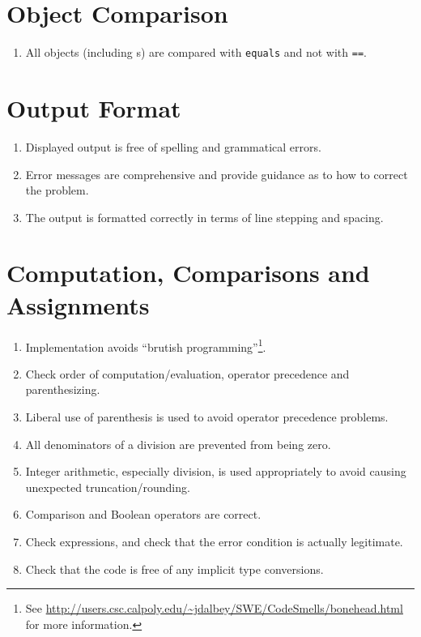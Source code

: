 \section*{Object Comparison}\begin{enumerate}[resume]
\item All objects (including s) are compared with \texttt{equals} and not with \texttt{==}.
\end{enumerate}

\section*{Output Format}\begin{enumerate}[resume]
\item Displayed output is free of spelling and grammatical errors.
\item Error messages are comprehensive and provide guidance as to how to correct the problem.
\item The output is formatted correctly in terms of line stepping and spacing.
\end{enumerate}

\section*{Computation, Comparisons and Assignments}\begin{enumerate}[resume]
\item Implementation avoids “brutish programming”\footnote{See \url{http://users.csc.calpoly.edu/~jdalbey/SWE/CodeSmells/bonehead.html} for more information.}. 
\item Check order of computation/evaluation, operator precedence and parenthesizing.
\item Liberal use of parenthesis is used to avoid operator precedence problems.
\item All denominators of a division are prevented from being zero.
\item Integer arithmetic, especially division, is used appropriately to avoid causing unexpected truncation/rounding.
\item Comparison and Boolean operators are correct.
\item Check  expressions, and check that the error condition is actually legitimate.
\item Check that the code is free of any implicit type conversions.
\end{enumerate}

